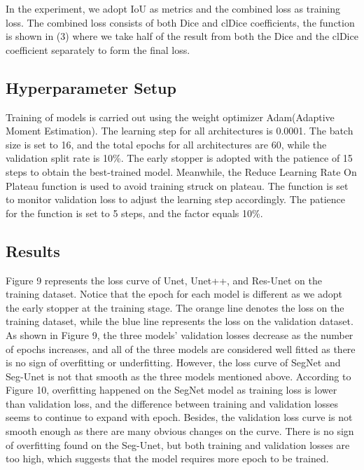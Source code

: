 \documentclass{article}
\begin{document}
In the experiment, we adopt IoU as metrics and the combined loss as training loss. The combined loss consists of both Dice and clDice coefficients, the function is shown in (3) where we take half of the result from both the Dice and the clDice coefficient separately to form the final loss.

\subsection{Hyperparameter Setup}
Training of models is carried out using the weight optimizer Adam(Adaptive Moment Estimation). The learning step for all architectures is 0.0001. The batch size is set to 16, and the total epochs for all architectures are 60, while the validation split rate is 10\%. The early stopper is adopted with the patience of 15 steps to obtain the best-trained model. Meanwhile, the Reduce Learning Rate On Plateau function is used to avoid training struck on plateau. The function is set to monitor validation loss to adjust the learning step accordingly. The patience for the function is set to 5 steps, and the factor equals 10\%.

\subsection{Results}
Figure 9 represents the loss curve of Unet, Unet++, and Res-Unet on the training dataset. Notice that the epoch for each model is different as we adopt the early stopper at the training stage. The orange line denotes the loss on the training dataset, while the blue line represents the loss on the validation dataset. As shown in Figure 9, the three models' validation losses decrease as the number of epochs increases, and all of the three models are considered well fitted as there is no sign of overfitting or underfitting. However, the loss curve of SegNet and Seg-Unet is not that smooth as the three models mentioned above.
According to Figure 10, overfitting happened on the SegNet model as training loss is lower than validation loss, and the difference between training and validation losses seems to continue to expand with epoch. Besides, the validation loss curve is not smooth enough as there are many obvious changes on the curve. There is no sign of overfitting found on the Seg-Unet, but both training and validation losses are too high, which suggests that the model requires more epoch to be trained.
\end{document}
